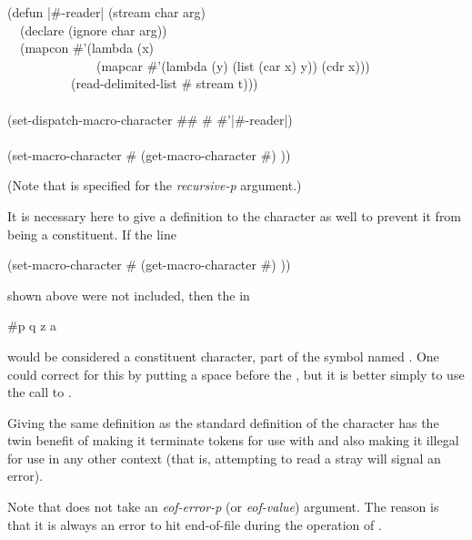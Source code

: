 \begin{defun}[Function]

\begin{lisp}
(defun |\#{\Xlbrace}-reader| (stream char arg) \\
~~(declare (ignore char arg)) \\
~~(mapcon \#'(lambda (x) \\
~~~~~~~~~~~~~~(mapcar \#'(lambda (y) (list (car x) y)) (cdr x))) \\
~~~~~~~~~~(read-delimited-list \#{\Xbackslash}{\Xrbrace} stream t))) \\
 \\
(set-dispatch-macro-character \#{\Xbackslash}\# \#{\Xbackslash}{\Xlbrace} \#'|\#{\Xlbrace}-reader|) \\
 \\
(set-macro-character \#{\Xbackslash}{\Xrbrace} (get-macro-character \#{\Xbackslash}) {\nil}))
\end{lisp}
(Note that {\true} is specified for the \emph{recursive-p} argument.)

It is necessary here to give a definition to the character \cd{{\Xrbrace}} as
well to prevent it from being a constituent.
If the line
\begin{lisp}
(set-macro-character \#{\Xbackslash}{\Xrbrace} (get-macro-character \#{\Xbackslash}) {\nil}))
\end{lisp}
shown above were not included, then the \cd{{\Xrbrace}} in
\begin{lisp}
\#{\Xlbrace}p q z a{\Xrbrace}
\end{lisp}
would be considered a constituent character, part of the symbol named
.  One could correct for this by putting a space before
the \cd{{\Xrbrace}}, but it is better simply to use the call to
.

Giving \cd{{\Xrbrace}} the same
definition as the standard definition of the character \cd{)} has the
twin benefit of making it terminate tokens for use with 
and also making it illegal for use in any other context (that is, attempting to
read a stray \cd{{\Xrbrace}} will signal an error).

Note that  does not take an \emph{eof-error-p}
(or \emph{eof-value})
argument.  The reason is that it is always an error
to hit end-of-file during the operation of .
\end{defun}


